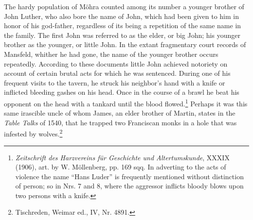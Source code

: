 The hardy population of Möhra counted among its number a
younger brother of John Luther, who also bore the name of John,
which had been given to him in honor of his god-father, regardless of
its being a repetition of the same name in the family. The first John
was referred to as the elder, or big John; his younger brother as the
younger, or little John. In the extant fragmentary court records of
Mansfeld, whither he had gone, the name of the younger brother occurs repeatedly.
According to these documents little John achieved
notoriety on account of certain brutal acts for which he was sentenced.
During one of his frequent visits to the tavern, he struck his neighbor’s
hand with a knife or inflicted bleeding gashes on his head. Once in the
course of a brawl he beat his opponent on the head with a tankard until
the blood flowed.\footnote{
\textit{Zeitschrift des Harzvereins für Geschichte und Altertumskunde}, XXXIX (1906), art.
by W. Möllenberg, pp. 169 sqq. In adverting to the acts of violence the name “Hans
Luder” is frequently mentioned without distinction of person; so in Nrs. 7 and 8, where
the aggressor inflicts bloody blows upon two persons with a knife.
}
Perhaps it was this same irascible uncle of whom
James, an elder brother of Martin, states in the \textit{Table Talks} of 1540,
that he trapped two Franciscan monks in a hole that was infested by
wolves.\footnote{Tischreden, Weimar ed., IV, Nr. 4891.}

